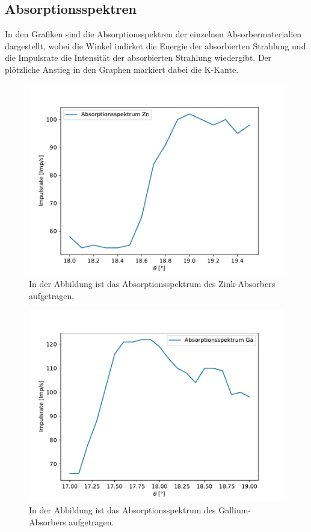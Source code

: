 \documentclass[titlepage = firstcover]{scrartcl}
\begin{document}
            \newpage
            \subsection{Absorptionsspektren}
            In den Grafiken sind die Absorptionsspektren der einzelnen Absorbermaterialien dargestellt, wobei die Winkel indirket die Energie der absorbierten Strahlung und die Impulsrate die 
            Intensität der absorbierten Strahlung wiedergibt. Der plötzliche Anstieg in den Graphen markiert dabei die K-Kante.

            \FloatBarrier
            \begin{figure}[h]
              \centering
              \includegraphics{Zink.pdf}
              \caption{In der Abbildung ist das Absorptionsspektrum des Zink-Absorbers aufgetragen.}
              \label{fig:Zink}
            \end{figure}

            \begin{figure}[h]
              \centering
              \includegraphics{Gallium.pdf}
              \caption{In der Abbildung ist das Absorptionsspektrum des Gallium-Absorbers aufgetragen.}
              \label{fig:Gallium}
            \end{figure}
\end{document}
